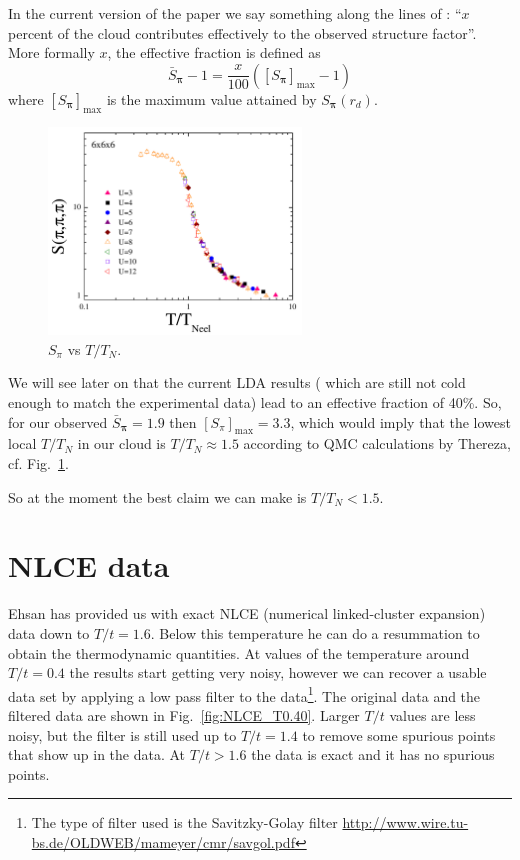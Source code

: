 \documentclass[11pt,letter]{article}
\newcommand{\bv}[1]{\ensuremath{\bm{#1}}}
\begin{document}
In the current version of the paper we say something along the lines of :
``$x$ percent of the cloud contributes effectively to the observed structure
factor''.   More formally $x$, the effective fraction is defined as 
\begin{equation}
  \bar{S}_{\bv{\pi}} - 1  =  
\frac{x}{100}  \left( [S_{\bv{\pi}}]_{\mathrm{max}} - 1 \right)  
\end{equation}
where $[S_{\bv{\pi}}]_{\mathrm{max}}$ is the maximum value attained by
$S_{\bv{\pi}}(r_{d})$.

\begin{figure}
    \centering
\includegraphics[width=0.6\textwidth]{figures/spilog.png}
\caption{$S_{\pi}$ vs $T/T_{N}$. }
\label{fig:spilog}
\end{figure}
We will see later on that the current LDA results ( which are still not cold
enough to match the experimental data) lead to an effective fraction of 40\%.
So,  for our observed $\bar{S}_{\bv{\pi}}=1.9$  then $ [S_{\pi}]_{\mathrm{max}}
= 3.3  $, which would imply that the lowest local $T/T_{N}$  in our cloud is
$T/T_{N} \approx 1.5$ according to QMC calculations by Thereza,  cf.
Fig.~\ref{fig:spilog}.  

So at the moment the best claim we can make is $T/T_{N}
< 1.5$. 
 

\section{ NLCE data }

Ehsan has provided us with exact NLCE (numerical linked-cluster expansion) data
down to $T/t=1.6$.  Below this temperature he can do a resummation to obtain
the thermodynamic quantities.  At values of the temperature around $T/t=0.4$ the
results start getting very noisy, however we can recover a usable data set by
applying a low pass filter to the data\footnote{The type of filter used is the
Savitzky-Golay filter
\url{http://www.wire.tu-bs.de/OLDWEB/mameyer/cmr/savgol.pdf}}.  The original
data and the filtered data are shown in Fig.~\ref{fig:NLCE_T0.40}.  Larger
$T/t$ values are less noisy, but the filter is still used up to $T/t=1.4$ to
remove some spurious points that show up in the data.  At $T/t > 1.6$ the data
is exact and it has no spurious points.
\end{document}

